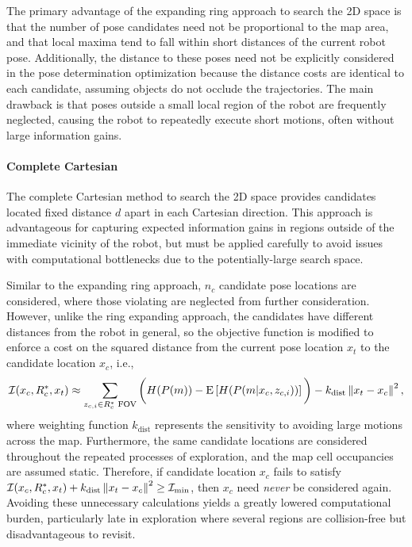 The primary advantage of the expanding ring approach to search the 2D space is that the number of pose candidates need not be proportional to the map area, and that local maxima tend to fall within short distances of the current robot pose. Additionally, the distance to these poses need not be explicitly considered in the pose determination optimization because the distance costs are identical to each candidate, assuming objects do not occlude the trajectories. The main drawback is that poses outside a small local region of the robot are frequently neglected, causing the robot to repeatedly execute short motions, often without large information gains.

\paragraph{Complete Cartesian}
The complete Cartesian method to search the 2D space provides candidates located fixed distance $d$ apart in each Cartesian direction. This approach is advantageous for capturing expected information gains in regions outside of the immediate vicinity of the robot, but must be applied carefully to avoid issues with computational bottlenecks due to the potentially-large search space.

Similar to the expanding ring approach, $n_c$ candidate pose locations are considered, where those violating  are neglected from further consideration. However, unlike the ring expanding approach, the candidates have different distances from the robot in general, so the objective function is modified to enforce a cost on the squared distance from the current pose location $x_t$ to the candidate location $x_c$, i.e.,
\begin{align}
\label{eqn:ObjFunApproxCompleteCartesian}
\mathcal I(x_c,R_c^*,x_t)\approx \sum_{z_{c,i}\in R_{c}^*\text{ FOV}}\bigg(H(P(m))-\text{E}\left[H(P(m|x_c,z_{c,i}))\right]\bigg)-k_\text{dist}\left\| x_t-x_c \right\|^2,
\end{align}
where weighting function $k_\text{dist}$ represents the sensitivity to avoiding large motions across the map. Furthermore, the same candidate locations are considered throughout the repeated processes of exploration, and the map cell occupancies are assumed static. Therefore, if candidate location $x_c$ fails to satisfy $\mathcal I(x_c,R_c^*,x_t)+k_\text{dist}\left\| x_t-x_c \right\|^2\geq\mathcal I_\text{min}$, then $x_c$ need \emph{never} be considered again. Avoiding these unnecessary calculations yields a greatly lowered computational burden, particularly late in exploration where several regions are collision-free but disadvantageous to revisit.


